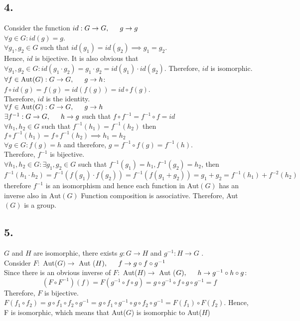 \documentclass[11pt]{article}
\begin{document}
\subsection*{4.}
Consider the function $id: G \to G, \indent g \to g$ \\
$\forall g \in G: id(g) = g$. \\ 
$\forall g_1, g_2 \in G$ such that $id(g_1) = id(g_2) \implies g_1 = g_2$. \\
Hence, $id$ is bijective. It is also obvious that $\forall g_1,g_2 \in G: id(g_1 \cdot g_2) = g_1 \cdot g_2 =id(g_1) \cdot id(g_2)$. Therefore, $id$ is isomorphic. \\
$\forall f \in \text{Aut}(G): G \to G, \indent g \to h$:\\
$f \circ id (g) = f(g) = id(f(g)) = id \circ f(g)$. \\
Therefore, $id$ is the identity. \\
$\forall f \in \text{Aut}(G): G \to G, \indent g \to h$\\
$\exists f^{-1}: G \to G, \indent h \to g$ such that $f\circ f^{-1} = f^{-1}\circ f = id$ \\
$\forall h_1,h_2 \in G$ such that $f^{-1}(h_1) = f^{-1}(h_2)$ then \\
$f \circ f^{-1} (h_1) = f \circ f^{-1}(h_2) \implies h_1 = h_2$ \\
$\forall g \in G:f(g) = h$ and therefore, $g = f^{-1} \circ f(g) = f^{-1}(h)$. \\
Therefore, $f^{-1}$ is bijective. \\
$\forall h_1,h_2 \in G: \exists g_1,g_2 \in G$ such that $f^{-1}(g_1) = h_1, f^{-1}(g_2) = h_2$, then \\
\[
f^{-1} (h_1 \cdot h_2) = f^{-1} (f(g_1) \cdot f(g_2)) = f^{-1}(f(g_1+g_2)) = g_1 + g_2 = f^{-1}(h_1) + f^{-2}(h_2)
\]
therefore $f^{-1}$ is an isomorphism and hence each function in Aut$(G)$ has an inverse also in Aut$(G)$
Function composition is associative.
Therefore, Aut$(G)$ is a group. 
\subsection*{5.}
$G$ and $H$ are isomorphic, there exists $g: G \to H$ and $g^{-1}: H \to G$	. \\
Consider $F:$ Aut($G) \to $ Aut ($H), \indent f \to g \circ f \circ g^{-1}$ \\
Since there is an obvious inverse of $F:$ Aut($H) \to $ Aut ($G), \indent h \to g^{-1} \circ h \circ g$:\\
\[
(F\circ F^{-1})(f) =F(g^{-1} \circ f  \circ g) = g \circ g^{-1} \circ f \circ g \circ g^{-1} = f
\]
Therefore, $F$ is bijective. $F(f_1 \circ f_2) = g \circ f_1 \circ f_2 \circ g^{-1} = g \circ f_1 \circ g^{-1} \circ g \circ f_2 \circ g^{-1} = F(f_1) \circ F(f_2)$. Hence, F is isomorphic, which means that Aut($G$) is isomorphic to Aut($H$)  
 
\end{document}
